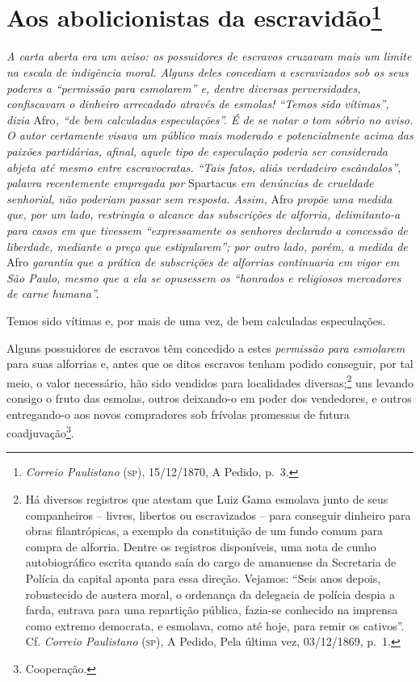 {\chapter{Aos abolicionistas da escravidão\footnote{\emph{Correio Paulistano} (\textsc{sp}), 15/12/1870, A Pedido,
  p.~3.}} %

\begin{didascalia}
\emph{A carta aberta era um aviso: os possuidores de escravos cruzavam
mais um limite na escala de indigência moral. Alguns deles concediam a
escravizados sob os seus poderes a ``permissão para esmolarem'' e, dentre
diversas perversidades, confiscavam o dinheiro arrecadado através de
esmolas! ``Temos sido vítimas'', dizia} Afro\emph{, ``de bem calculadas
especulações''. É de se notar o tom sóbrio no aviso. O autor certamente
visava um público mais moderado e potencialmente acima das paixões
partidárias, afinal, aquele tipo de especulação poderia ser considerada
abjeta até mesmo entre escravocratas. ``Tais fatos, aliás verdadeiro
escândalos'', palavra recentemente empregada por} Spartacus \emph{em
denúncias de crueldade senhorial, não poderiam passar sem resposta.
Assim,} Afro \emph{propõe uma medida que, por um lado, restringia o
alcance das subscrições de alforria, delimitanto-a para casos em que
tivessem ``expressamente os senhores declarado a concessão de liberdade,
mediante o preço que estipularem''; por outro lado, porém, a medida de}
Afro \emph{garantia que a prática de subscrições de alforrias
continuaria em vigor em São Paulo, mesmo que a ela se opusessem os
``honrados e religiosos mercadores de carne humana''.}
\end{didascalia}


Temos sido vítimas e, por mais de uma vez, de bem calculadas
especulações.

Alguns possuidores de escravos têm concedido a estes \emph{permissão
para esmolarem} para suas alforrias e, antes que os ditos escravos
tenham podido conseguir, por tal meio, o valor necessário, hão sido
vendidos para localidades diversas;\footnote{ Há diversos registros que
  atestam que Luiz Gama esmolava junto de seus companheiros -- livres,
  libertos ou escravizados -- para conseguir dinheiro para obras
  filantrópicas, a exemplo da constituição de um fundo comum para compra
  de alforria. Dentre os registros disponíveis, uma nota de cunho
  autobiográfico escrita quando saía do cargo de amanuense da Secretaria
  de Polícia da capital aponta para essa direção. Vejamos: ``Seis anos
  depois, robustecido de austera moral, o ordenança da delegacia de
  polícia despia a farda, entrava para uma repartição pública, fazia-se
  conhecido na imprensa como extremo democrata, e esmolava, como até
  hoje, para remir os cativos''. Cf. \emph{Correio Paulistano} (\textsc{sp}), A
  Pedido, Pela última vez, 03/12/1869, p.~1.} uns levando consigo o
fruto das esmolas, outros deixando-o em poder dos vendedores, e outros
entregando-o aos novos compradores sob frívolas promessas de futura
coadjuvação\footnote{ Cooperação.}.

}

